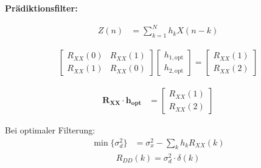 \textbf{Prädiktionsfilter:}


\begin{align}
Z(n) &= \sum_{k=1}^{N} h_k X(n-k)
\end{align}

\begin{align}
\begin{bmatrix}
R_{XX}(0) & R_{XX}(1) \\
R_{XX}(1) & R_{XX}(0)
\end{bmatrix}
\begin{bmatrix}
h_{1,\text{opt}} \\
h_{2,\text{opt}}
\end{bmatrix}
=
\begin{bmatrix}
R_{XX}(1) \\
R_{XX}(2)
\end{bmatrix}
\end{align}

\begin{align}
\mathbf{R_{XX}} \cdot \mathbf{h_{\text{opt}}} &=
\begin{bmatrix}
R_{XX}(1) \\
R_{XX}(2)
\end{bmatrix}
\end{align}


Bei optimaler Filterung:
\begin{align}
\min\{\sigma_d^2\} &= \sigma_x^2 - \sum_{k} h_k R_{XX}(k)
\end{align}
\begin{align}
R_{DD}(k) = \sigma^2_d \cdot \delta(k)
\end{align}
